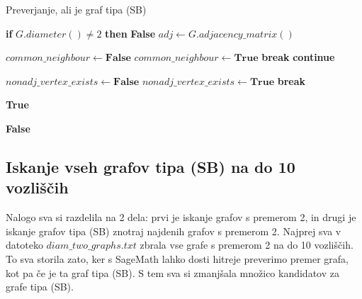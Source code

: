 \documentclass{article}
\begin{document}
\begin{algorithm}
\caption{Preverjanje, ali je graf tipa (SB)}
\begin{algorithmic}[1]
 
    \State \textbf{if} $G.diameter() \neq 2$ \textbf{then} \Return \textbf{False} 
    \State $adj \gets G.adjacency\_matrix()$ 

         
             
                \State $common\_neighbour \gets \textbf{False}$
                     
                        \State $common\_neighbour \gets \textbf{True}$
                        \State \textbf{break}
                    \EndIf
                \EndFor
                    \State \textbf{continue}
                \EndIf

                \State $nonadj\_vertex\_exists \gets \textbf{False}$
                        \State $nonadj\_vertex\_exists \gets \textbf{True}$
                        \State \textbf{break}
                    \EndIf
                \EndFor

                    \State \Return \textbf{True}
                \EndIf
            \EndIf
        \EndFor
    \EndFor

    \State \Return \textbf{False} 
\EndFunction
\end{algorithmic}
\end{algorithm}


\subsection{Iskanje vseh grafov tipa (SB) na do 10 vozliščih}
Nalogo sva si razdelila na 2 dela: prvi je iskanje grafov s premerom 2, in drugi je iskanje grafov tipa (SB) znotraj najdenih grafov s premerom 2.
Najprej sva v datoteko $diam\_two\_graphs.txt$ zbrala vse grafe s premerom 2 na do 10 vozliščih. To sva storila zato, ker s SageMath lahko dosti hitreje preverimo premer grafa, kot pa če je ta graf tipa (SB). S tem sva si zmanjšala množico kandidatov za grafe tipa (SB).
\end{document}
